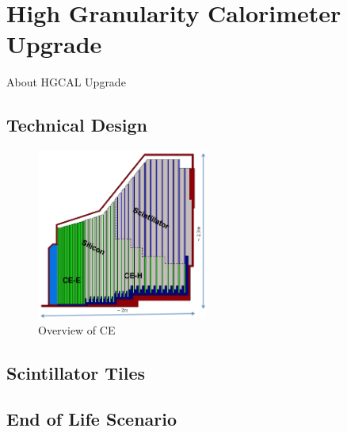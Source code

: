 \section{
  High Granularity Calorimeter Upgrade
 }

About \gls{HGCAL} Upgrade

\subsection{
  Technical Design
}

\begin{figure}[!ht]
  \centering
  \includegraphics[width=0.5\textwidth]{figures/hgcal_quadrant.pdf}
  \caption[Overview of CE]{Overview of CE~\cite{image-cms-hgcal-quadrant-layout}}%
  \label{fig:cms-hgcal-quadrant-layout}
\end{figure}

\subsection{
  Scintillator Tiles
}

\subsection{
  End of Life Scenario
}
